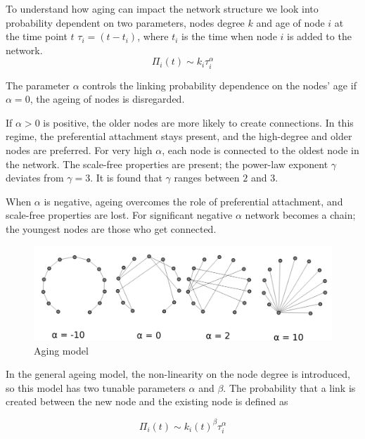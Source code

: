 To understand how aging can impact the network structure we look into probability dependent on two parameters, nodes degree $k$ and age of node $i$ at the time point $t$ $\tau_i=(t-t_i)$, where $t_i$ is the time when node $i$ is added to the network. 
\begin{equation}
\Pi_{i}(t)\sim k_{i}\tau_{i}^{\alpha} 
\label{eq:aging}
\end{equation}

The parameter $\alpha$ controls the linking probability dependence on the nodes' age if $\alpha=0$, the ageing of nodes is disregarded. 

If $\alpha>0$ is positive, the older nodes are more likely to create connections. In this regime, the preferential attachment stays present, and the high-degree and older nodes are preferred. For very high $\alpha$, each node is connected to the oldest node in the network. The scale-free properties are present; the power-law exponent $\gamma$ deviates from $\gamma=3$. It is found that $\gamma$ ranges between $2$ and $3$. 

When $\alpha$ is negative, ageing overcomes the role of preferential attachment, and scale-free properties are lost. For significant negative $\alpha$ network becomes a chain; the youngest nodes are those who get connected. 

\begin{figure}[!ht]
	\centering
	\includegraphics[width=1\linewidth]{figures/aging_nets.png}
	\caption{Aging model}
	\label{fig:aging}
\end{figure}

In the general ageing model, the non-linearity on the node degree is introduced, so this model has two tunable parameters $\alpha $ and $\beta$. The probability that a link is created between the new node and the existing node is defined as

\begin{equation}
\Pi_{i}(t)\sim k_{i}(t)^{\beta}\tau_{i}^{\alpha} 
\label{eq:1}
\end{equation}

